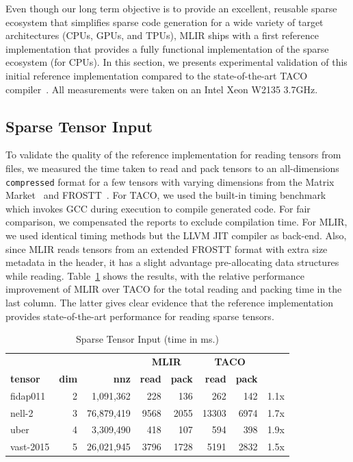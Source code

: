 \documentclass[10pt]{article}
\newcommand{\tabel}[1]{\begin{table}[#1]\begin{center}}
\newcommand{\lebat}[2]{\end{center}\caption{#1}\label{#2}\end{table}}
\begin{document}
Even though our long term objective is to provide an excellent, reusable sparse ecosystem that simplifies sparse code generation for a wide variety of target architectures (CPUs, GPUs, and TPUs), MLIR ships with a first reference implementation that provides a fully functional implementation of the sparse ecosystem (for CPUs). In this section, we presents experimental validation of this initial reference implementation compared to the state-of-the-art TACO compiler~\cite{taco}. All measurements were taken on an Intel Xeon W2135 3.7GHz.

\subsection{Sparse Tensor Input}

To validate the quality of the reference implementation for reading tensors from files, we measured the time taken to read and pack tensors to an all-dimensions \texttt{compressed} format for a few tensors with varying dimensions from the Matrix Market~\cite{matrixmarket} and FROSTT~\cite{frostt}. For TACO, we used the built-in timing benchmark which invokes GCC during execution to compile generated code. For fair comparison, we compensated the reports to exclude compilation time. For MLIR, we used identical timing methods but the LLVM JIT compiler as back-end. Also, since MLIR reads tensors from an extended FROSTT format with extra size metadata in the header, it has a slight advantage pre-allocating data structures while reading. Table~\ref{tab:sparseio} shows the results, with the relative performance improvement of MLIR over TACO for the total reading and packing time in the last column. The latter gives clear evidence that the reference implementation provides state-of-the-art performance for reading sparse tensors.

\tabel{ht}
\footnotesize
\begin{tabular}{|lrr|rr|rr|l|}
\hline
\multicolumn{3}{|c|}{}              &
\multicolumn{2}{|c|}{\textbf{MLIR}} &
\multicolumn{2}{|c|}{\textbf{TACO}} & \\
\textbf{tensor} & \textbf{dim}  & \textbf{nnz} & 
\textbf{read}   & \textbf{pack} &
\textbf{read}   & \textbf{pack} & \\
\hline
fidap011  & 2 &  1,091,362 &  228 &  136 &   262 &  142 & 1.1x \\
nell-2    & 3 & 76,879,419 & 9568 & 2055 & 13303 & 6974 & 1.7x \\
uber      & 4 &  3,309,490 &  418 &  107 &   594 &  398 & 1.9x \\
vast-2015 & 5 & 26,021,945 & 3796 & 1728 &  5191 & 2832 & 1.5x \\
\hline
\end{tabular}
\lebat{Sparse Tensor Input (time in ms.)}{tab:sparseio}
\end{document}
